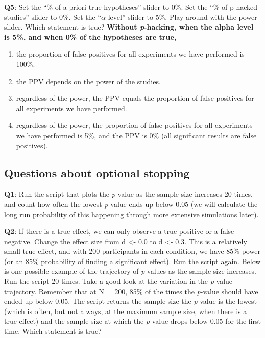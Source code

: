 \documentclass[
  oneside]{book}
\providecommand{\tightlist}{%
  \setlength{\itemsep}{0pt}\setlength{\parskip}{0pt}}
\begin{document}
\textbf{Q5}: Set the ``\% of a priori true hypotheses'' slider to 0\%. Set the ``\% of p-hacked studies'' slider to 0\%. Set the ``\(\alpha\) level'' slider to 5\%. Play around with the power slider. Which statement is true?
\textbf{Without \emph{p}-hacking, when the alpha level is 5\%, and when 0\% of the hypotheses are true, }

\begin{enumerate}
\def\labelenumi{\Alph{enumi})}
\tightlist
\item
  the proportion of false positives for all experiments we have performed is 100\%.
\item
  the PPV depends on the power of the studies.
\item
  regardless of the power, the PPV equals the proportion of false positives for all experiments we have performed.
\item
  regardless of the power, the proportion of false positives for all experiments we have performed is 5\%, and the PPV is 0\% (all significant results are false positives).
\end{enumerate}

\hypertarget{questions-about-optional-stopping}{%
\subsection{Questions about optional stopping}\label{questions-about-optional-stopping}}

\textbf{Q1}: Run the script that plots the \emph{p}-value as the sample size increases 20 times, and count how often the lowest \emph{p}-value ends up below 0.05 (we will calculate the long run probability of this happening through more extensive simulations later).

\textbf{Q2}: If there is a true effect, we can only observe a true positive or a false negative. Change the effect size from d \textless- 0.0 to d \textless- 0.3. This is a relatively small true effect, and with 200 participants in each condition, we have 85\% power (or an 85\% probability of finding a significant effect). Run the script again. Below is one possible example of the trajectory of \emph{p}-values as the sample size increases. Run the script 20 times. Take a good look at the variation in the \emph{p}-value trajectory. Remember that at N = 200, 85\% of the times the \emph{p}-value should have ended up below 0.05. The script returns the sample size the \emph{p}-value is the lowest (which is often, but not always, at the maximum sample size, when there is a true effect) and the sample size at which the \emph{p}-value drops below 0.05 for the first time. Which statement is true?
\end{document}
